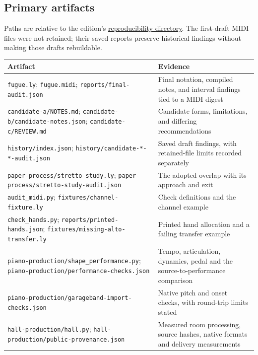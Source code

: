 \documentclass[11pt,a4paper]{article}
\begin{document}
\subsection{Primary artifacts}\label{primary-artifacts}

Paths are relative to the edition's \href{https://chi-feng.github.io/fuga-inversa/reproducibility/README.md}{reproducibility directory}. The first-draft MIDI files were not retained; their saved reports preserve historical findings without making those drafts rebuildable.

{\def\LTcaptype{table}
\par\addvspace{\LTpre}
{\small\noindent
\begin{tabular}{@{}
  >{\raggedright\arraybackslash}p{}
  >{\raggedright\arraybackslash}p{}@{}}
\toprule\noalign{}
\begin{minipage}[b]{\linewidth}\raggedright
Artifact
\end{minipage} & \begin{minipage}[b]{\linewidth}\raggedright
Evidence
\end{minipage} \\
\midrule\noalign{}

\nolinkurl{fugue.ly}; \nolinkurl{fugue.midi}; \nolinkurl{reports/final-audit.json} & Final notation, compiled notes, and interval findings tied to a MIDI digest \\
\nolinkurl{candidate-a/NOTES.md}; \nolinkurl{candidate-b/candidate-notes.json}; \nolinkurl{candidate-c/REVIEW.md} & Candidate forms, limitations, and differing recommendations \\
\nolinkurl{history/index.json}; \nolinkurl{history/candidate-*-*-audit.json} & Saved draft findings, with retained-file limits recorded separately \\
\nolinkurl{paper-process/stretto-study.ly}; \nolinkurl{paper-process/stretto-study-audit.json} & The adopted overlap with its approach and exit \\
\nolinkurl{audit_midi.py}; \nolinkurl{fixtures/channel-fixture.ly} & Check definitions and the channel example \\
\nolinkurl{check_hands.py}; \nolinkurl{reports/printed-hands.json}; \nolinkurl{fixtures/missing-alto-transfer.ly} & Printed hand allocation and a failing transfer example \\
\nolinkurl{piano-production/shape_performance.py}; \nolinkurl{piano-production/performance-checks.json} & Tempo, articulation, dynamics, pedal and the source-to-performance comparison \\
\nolinkurl{piano-production/garageband-import-checks.json} & Native pitch and onset checks, with round-trip limits stated \\
\nolinkurl{hall-production/hall.py}; \nolinkurl{hall-production/public-provenance.json} & Measured room processing, source hashes, native formats and delivery measurements \\
\bottomrule
\end{tabular}
\par}
\addvspace{\LTpost}
}
\end{document}

